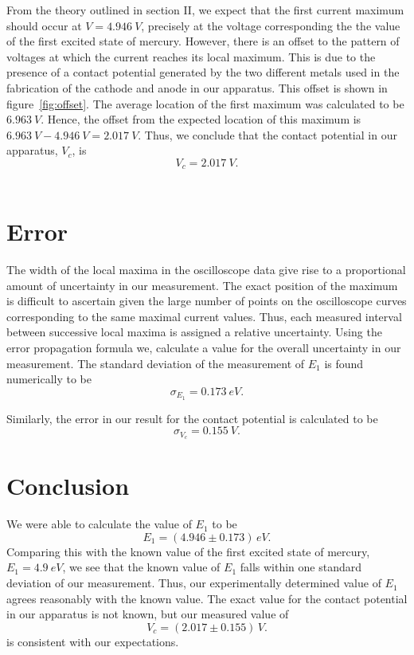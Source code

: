 \documentclass[aps, reprint,amsmath,amssymb]{revtex4-1} %
\begin{document}
From the theory outlined in section II, we expect that the first current maximum should occur at $V = \SI{4.946}{V}$, precisely at the voltage corresponding the the value of the first excited state of mercury. However, there is an offset to the pattern of voltages at which the current reaches its local maximum. This is due to the presence of a contact potential generated by the two different metals used in the fabrication of the cathode and anode in our apparatus. This offset is shown in figure~\ref{fig:offset}. The average location of the first maximum was calculated to be $\SI{6.963}{V}$. Hence, the offset from the expected location of this maximum is $\SI{6.963}{V} - \SI{4.946}{V} = \SI{2.017}{V}$. Thus, we conclude that the contact potential in our apparatus, $V_c$, is
\[
	V_c = \SI{2.017}{V}.
\] \\

\section{Error}

The width of the local maxima in the oscilloscope data give rise to a proportional amount of uncertainty in our measurement. The exact position of the maximum is difficult to ascertain given the large number of points on the oscilloscope curves corresponding to the same maximal current values. Thus, each measured interval between successive local maxima is assigned a relative uncertainty. Using the error propagation formula we, calculate a value for the overall uncertainty in our measurement. The standard deviation of the measurement of $E_1$ is found numerically to be
\[
    \sigma_{E_1} = \SI{0.173}{eV}.
\]

Similarly, the error in our result for the contact potential is calculated to be
\[
    \sigma_{V_c} = \SI{0.155}{V}.
\]

\section{Conclusion}
We were able to calculate the value of $E_1$ to be
\[
    E_1 = (4.946 \pm 0.173) \, \si{eV}.
\]
Comparing this with the known value of the first excited state of mercury, $E_1 = \SI{4.9}{eV}$, we see that the known value of $E_1$ falls within one standard deviation of our measurement. Thus, our experimentally determined value of $E_1$ agrees reasonably with the
known value. The exact value for the contact potential in our apparatus is not known, but our measured value of 
\[
    V_c = (2.017 \pm 0.155) \, \si{V}.
\]
is consistent with our expectations.
\end{document}
